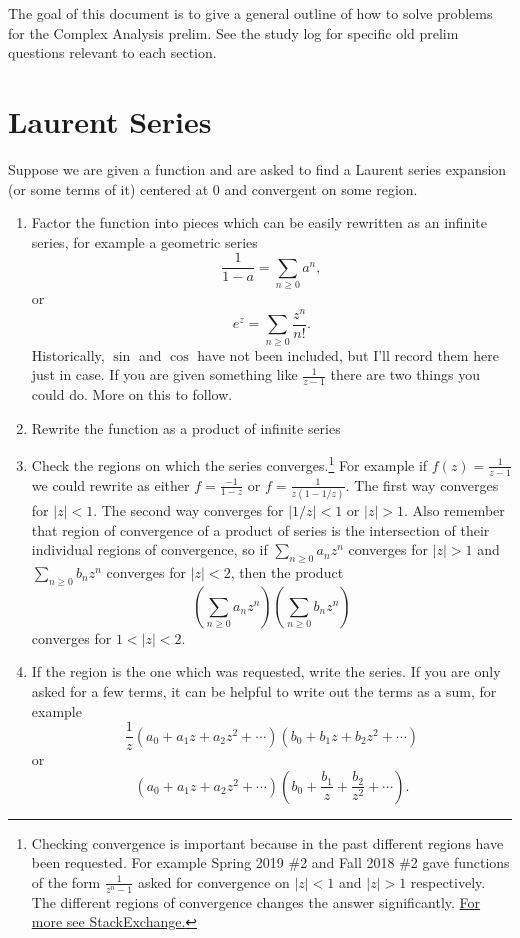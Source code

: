 \documentclass[10pt]{article}
\begin{document}
The goal of this document is to give a general outline of how to solve problems for the Complex Analysis prelim. See the study log for specific old prelim questions relevant to each section.

\section{Laurent Series}

Suppose we are given a function and are asked to find a Laurent series expansion (or some terms of it) centered at $0$ and convergent on some region. 
\begin{enumerate}
	\item Factor the function into pieces which can be easily rewritten as an infinite series, for example a geometric series \[\frac{1}{1- a} = \sum_{n \geq 0} a^n,\] or \[e^z = \sum_{n\geq 0} \frac{z^n}{n!}.\] 
	Historically, $\sin$ and $\cos$ have not been included, but I'll record them here just in case.
	If you are given something like $\frac{1}{z-1}$ there are two things you could do. More on this to follow.
	\item Rewrite the function as a product of infinite series
	\item Check the regions on which the series converges.\footnote{Checking convergence is important because in the past different regions have been requested. For example Spring 2019 \#2 and Fall 2018 \#2 gave functions of the form $\frac{1}{z^n-1}$ asked for convergence on $|z|<1$ and $|z|>1$ respectively. The different regions of convergence changes the answer significantly. \href{https://math.stackexchange.com/questions/2553132/laurent-series-for-different-domains}{For more see StackExchange.}} For example if $f(z) = \frac{1}{z-1}$ we could rewrite as either $f = \frac{-1}{1-z}$ or $f = \frac{1}{z(1-1/z)}$. 
	The first way converges for $|z|<1$. The second way converges for $|1/z|<1$ or $|z|>1$. Also remember that region of convergence of a product of series is the intersection of their individual regions of convergence, so if $\sum_{n\geq 0} a_n z^n$ converges for $|z|>1$ and $\sum_{n \geq 0} b_n z^n$ converges for $|z|<2$, then the product
	\[ \left ( \sum_{n\geq 0} a_n z^n\right) \left ( \sum_{n \geq 0} b_n z^n\right)\]
	converges for $1 < |z| < 2$.
	
	
	
	\item If the region is the one which was requested, write the series. 
	If you are only asked for a few terms, it can be helpful to write out the terms as a sum, for example
	\[\frac{1}{z} (a_0 + a_1 z + a_2 z^2 + \cdots ) (b_0 + b_1 z + b_2 z^2 + \cdots)\]
	or 
	\[(a_0 + a_1 z + a_2 z^2 + \cdots ) (b_0 + \frac{b_1 }{z} + \frac{b_2}{z^2} + \cdots).\]
	

\end{enumerate}
\end{document}
